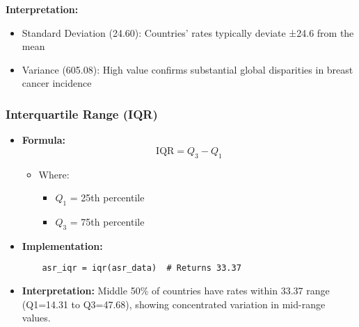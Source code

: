 \begin{frame}[fragile]
    \item \textbf{Interpretation:}
    \begin{itemize}
        \item Standard Deviation (\SI{24.60}{\perthousand}): Countries' rates typically deviate ±24.6 from the mean
        \item Variance (605.08): High value confirms substantial global disparities in breast cancer incidence
    \end{itemize}
\end{frame}

\begin{frame}[fragile]
    \frametitle{Interquartile Range (IQR)}
    \begin{itemize}
        \item \textbf{Formula:}
              \[
                  \text{IQR} = Q_3 - Q_1
              \]
              \begin{itemize}
                  \item Where:
                        \begin{itemize}
                            \item $Q_1$ = 25th percentile
                            \item $Q_3$ = 75th percentile
                        \end{itemize}
              \end{itemize}

        \item \textbf{Implementation:}
              \begin{lstlisting}
    asr_iqr = iqr(asr_data)  # Returns 33.37
                        \end{lstlisting}

        \item \textbf{Interpretation:} Middle 50\% of countries have rates within \SI{33.37}{\perthousand} range (Q1=\SI{14.31}{\perthousand} to Q3=\SI{47.68}{\perthousand}), showing concentrated variation in mid-range values.
    \end{itemize}
\end{frame}


